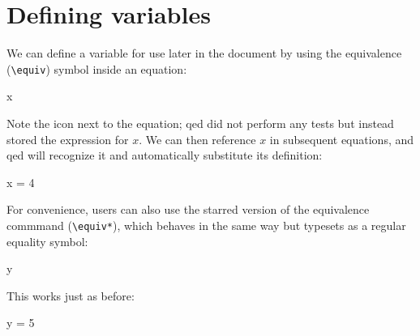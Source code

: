 \documentclass{article}
\begin{document}
\section*{Defining variables}

We can define a variable for use later in the document by using the
equivalence (\verb!\equiv!) symbol inside an equation:
%
\begin{qed}
    x \equiv {}
\end{qed}
%
Note the icon next to the equation; \textsf{qed} did not perform
any tests but instead stored the expression for $x$.
%
We can then reference $x$ in subsequent equations, and \textsf{qed}
will recognize it and automatically substitute its definition:
%
\begin{qed}
    x = 4
\end{qed}
%
For convenience, users can also use the starred version of the
equivalence commmand (\verb!\equiv*!), which behaves in the same
way but typesets as a regular equality symbol:
%
%
\begin{qed}
    y \equiv* {}
\end{qed}
%
This works just as before:
%
\begin{qed}
    y = 5
\end{qed}
%
%
\end{document}
